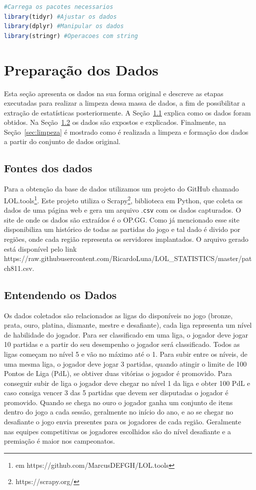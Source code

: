 \documentclass[a4paper]{article}
\begin{document}
\begin{lstlisting}[language=R, caption={Pacotes utilizados no projeto},label={cod:library}]
#Carrega os pacotes necessarios
library(tidyr) #Ajustar os dados
library(dplyr) #Manipular os dados
library(stringr) #Operacoes com string
\end{lstlisting}

\section{Preparação dos Dados}
Esta seção apresenta os dados na sua forma original e descreve as etapas executadas para realizar a limpeza dessa massa de dados, a fim de possibilitar a extração de estatísticas posteriormente. A Seção~\ref{sec:fontedados} explica como os dados foram obtidos. Na Seção~\ref{sec:entendendo} os dados são expostos e explicados. Finalmente, na Seção~\ref{sec:limpeza} é mostrado como é realizada a limpeza e formação dos dados a partir do conjunto de dados original.

\subsection{Fontes dos dados}
\label{sec:fontedados}
Para a obtenção da base de dados utilizamos um projeto do GitHub chamado LOL.tools\footnote{em https://github.com/MarcusDEFGH/LOL.tools}. Este projeto utiliza o Scrapy\footnote{https://scrapy.org/}, biblioteca em Python, que coleta os dados de uma página web e gera um arquivo .\texttt{csv} com os dados capturados. O site de onde os dados são extraídos é o OP.GG. Como já mencionado esse site disponibiliza um histórico de todas as partidas do jogo e tal dado é divido por regiões, onde cada região representa os servidores implantados. O arquivo gerado está disponível pelo link https://raw.githubusercontent.com/RicardoLuna/LOL\_STATISTICS/master/patch811.csv.

\subsection{Entendendo os Dados}
\label{sec:entendendo}
Os dados coletados são relacionados as ligas do disponíveis no jogo (bronze, prata, ouro, platina, diamante, mestre e desafiante), cada liga representa um nível de habilidade do jogador. Para ser classificado em uma liga, o jogador deve jogar 10 partidas e a partir do seu desempenho o jogador será classificado. Todos as ligas começam no nível 5 e vão no máximo até o 1. Para subir entre os níveis, de uma mesma liga, o jogador deve jogar 3 partidas, quando atingir o limite de 100 Pontos de Liga (PdL), se obtiver duas vitórias o jogador é promovido. Para conseguir subir de liga o jogador deve chegar no nível 1 da liga e obter 100 PdL e caso consiga vencer 3 das 5 partidas que devem ser disputadas o jogador é promovido. Quando se chega no ouro o jogador ganha um conjunto de itens dentro do jogo a cada sessão, geralmente no início do ano, e ao se chegar no desafiante o jogo envia presentes para os jogadores de cada região. Geralmente nas equipes competitivas os jogadores escolhidos são do nível desafiante e a premiação é maior nos campeonatos. 
\end{document}
